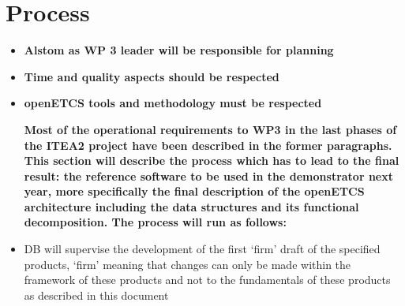 \section{Process}
\begin{itemize}
\item\textbf{Alstom as WP 3 leader will be responsible for planning}
\item\textbf{Time and quality aspects should be respected}
\item\textbf{openETCS tools and methodology must be respected}



\textbf{Most of the operational requirements to WP3 in the last phases of the ITEA2 project have been described in the former paragraphs. This section will describe the process which has to lead to the final result: the reference software to be used in the demonstrator next year, more specifically the final description of the openETCS architecture including the data structures and its functional decomposition. The process will run as follows:}

\item DB will supervise  the development of the first ‘firm’ draft of the specified products, ‘firm’ meaning that changes can only be made within the framework of these products and not to the fundamentals of these products as described in this document


\end{itemize}
